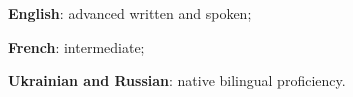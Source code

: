 

\begin{cventries}
  \cventry
    {}
    {}
    {}
    {}
    {
      \begin{cvitems} %
        \vspace{-10.0mm}
        \item{\textbf{English}: advanced written and spoken;}
		\item{\textbf{French}: intermediate;}
		\item{\textbf{Ukrainian and Russian}: native bilingual proficiency.}
      \end{cvitems}
    }
\end{cventries}
